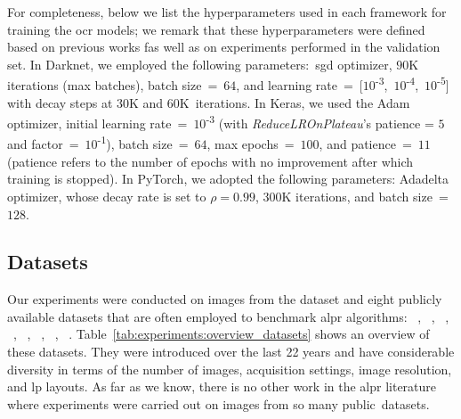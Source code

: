 For completeness, below we list the hyperparameters used in each framework for training the \gls*{ocr} models; we remark that these hyperparameters were defined based on previous works fas well as on experiments performed in the validation set.
In Darknet, we employed the following parameters:~\gls*{sgd} optimizer, $90$K iterations (max batches), batch size~=~$64$, and learning rate~=~[$10$\textsuperscript{-$3$},~$10$\textsuperscript{-$4$},~$10$\textsuperscript{-$5$}] with decay steps at $30$K and $60$K~iterations.
In Keras, we used the Adam optimizer, initial learning rate~=~$10$\textsuperscript{-$3$} (with \textit{ReduceLROnPlateau}'s patience = $5$ and factor~=~$10$\textsuperscript{-$1$}), batch size~=~$64$, max epochs~=~$100$, and patience~=~$11$ (patience refers to the number of epochs with no improvement after which training is stopped).
In PyTorch, we adopted the following parameters: Adadelta optimizer, whose decay rate is set to $\rho= 0.99$,  $300$K iterations, and batch size~=~$128$.

\subsection{Datasets}
\label{sec:experiments-datasets}

Our experiments were conducted on images from the \dataset dataset and eight publicly available datasets that are often employed to benchmark \gls*{alpr} algorithms:
\caltech~\citep{caltech}, \englishlp~\citep{englishlp}, \stills~\citep{ucsd}, \chineselp~\citep{zhou2012principal}, \aolp~\citep{hsu2013application}, \openalpreu~\citep{openalpreu}, \ssigsegplate~\citep{goncalves2016benchmark}, \ufpralpr~\citep{laroca2018robust}.
Table~\ref{tab:experiments:overview_datasets} shows an overview of these datasets.
They were introduced over the last 22 years and have considerable diversity in terms of the number of images, acquisition settings, image resolution, and \gls*{lp} layouts.
As far as we know, there is no other work in the \gls*{alpr} literature where experiments were carried out on images from so many public~datasets.

